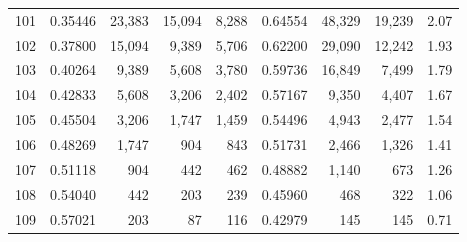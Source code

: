 \begin{longtable}{rrrrrrrrr}
101 & 0.35446 & 23,383 & 15,094 & 8,288 & 0.64554 & 48,329 & 19,239 & 2.07 \\
102 & 0.37800 & 15,094 & 9,389 & 5,706 & 0.62200 & 29,090 & 12,242 & 1.93 \\
103 & 0.40264 & 9,389 & 5,608 & 3,780 & 0.59736 & 16,849 & 7,499 & 1.79 \\
104 & 0.42833 & 5,608 & 3,206 & 2,402 & 0.57167 & 9,350 & 4,407 & 1.67 \\
105 & 0.45504 & 3,206 & 1,747 & 1,459 & 0.54496 & 4,943 & 2,477 & 1.54 \\
106 & 0.48269 & 1,747 & 904 & 843 & 0.51731 & 2,466 & 1,326 & 1.41 \\
107 & 0.51118 & 904 & 442 & 462 & 0.48882 & 1,140 & 673 & 1.26 \\
108 & 0.54040 & 442 & 203 & 239 & 0.45960 & 468 & 322 & 1.06 \\
109 & 0.57021 & 203 & 87 & 116 & 0.42979 & 145 & 145 & 0.71 \\
\end{longtable}
